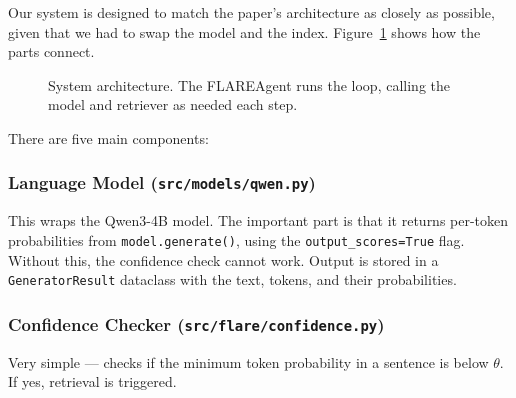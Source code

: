 \documentclass[conference]{IEEEtran}
\begin{document}
Our system is designed to match the paper's architecture as closely
as possible, given that we had to swap the model and the index.
Figure~\ref{fig:architecture} shows how the parts connect.

\begin{figure}[htbp]
\centering
{}
\caption{System architecture. The FLAREAgent runs the loop,
calling the model and retriever as needed each step.}
\label{fig:architecture}
\end{figure}

There are five main components:

\subsubsection*{Language Model (\texttt{src/models/qwen.py})}
This wraps the Qwen3-4B model. The important part is that it
returns per-token probabilities from \texttt{model.generate()},
using the \texttt{output\_scores=True} flag. Without this, the
confidence check cannot work. Output is stored in a
\texttt{GeneratorResult} dataclass with the text, tokens,
and their probabilities.

\subsubsection*{Confidence Checker (\texttt{src/flare/confidence.py})}
Very simple — checks if the minimum token probability in a sentence
is below $\theta$. If yes, retrieval is triggered.
\end{document}
